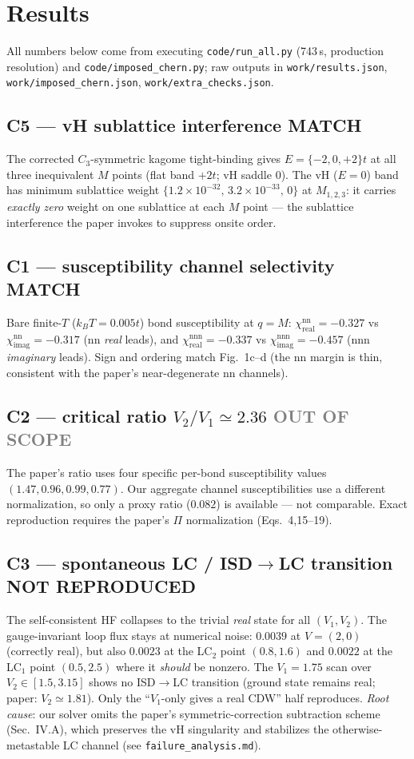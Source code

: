 \documentclass[11pt]{article}
\newcommand{\pass}{\textcolor{green!55!black}{\textbf{MATCH}}}
\newcommand{\fail}{\textcolor{red!75!black}{\textbf{NOT REPRODUCED}}}
\newcommand{\oos}{\textcolor{gray}{\textbf{OUT OF SCOPE}}}
\begin{document}
\section{Results}
All numbers below come from executing \texttt{code/run\_all.py} (743\,s,
production resolution) and \texttt{code/imposed\_chern.py}; raw outputs in
\texttt{work/results.json}, \texttt{work/imposed\_chern.json},
\texttt{work/extra\_checks.json}.

\subsection*{C5 --- vH sublattice interference \hfill \pass}
The corrected $C_3$-symmetric kagome tight-binding gives $E=\{-2,0,+2\}t$ at all
three inequivalent $M$ points (flat band $+2t$; vH saddle $0$). The vH ($E=0$)
band has minimum sublattice weight $\{1.2\times10^{-32},\,3.2\times10^{-33},\,0\}$
at $M_{1,2,3}$: it carries \emph{exactly zero} weight on one sublattice at each
$M$ point --- the sublattice interference the paper invokes to suppress onsite
order.

\subsection*{C1 --- susceptibility channel selectivity \hfill \pass}
Bare finite-$T$ ($k_BT=0.005t$) bond susceptibility at $q=M$:
$\chi^{\mathrm{nn}}_{\mathrm{real}}=-0.327$ vs
$\chi^{\mathrm{nn}}_{\mathrm{imag}}=-0.317$ (nn \emph{real} leads), and
$\chi^{\mathrm{nnn}}_{\mathrm{real}}=-0.337$ vs
$\chi^{\mathrm{nnn}}_{\mathrm{imag}}=-0.457$ (nnn \emph{imaginary} leads).
Sign and ordering match Fig.~1c--d (the nn margin is thin, consistent with the
paper's near-degenerate nn channels).

\subsection*{C2 --- critical ratio $V_2/V_1\simeq2.36$ \hfill \oos}
The paper's ratio uses four specific per-bond susceptibility values
$(1.47,0.96,0.99,0.77)$. Our aggregate channel susceptibilities use a different
normalization, so only a proxy ratio ($0.082$) is available --- not comparable.
Exact reproduction requires the paper's $\Pi$ normalization (Eqs.~4,15--19).

\subsection*{C3 --- spontaneous LC / ISD$\to$LC transition \hfill \fail}
The self-consistent HF collapses to the trivial \emph{real} state for all
$(V_1,V_2)$. The gauge-invariant loop flux stays at numerical noise:
$0.0039$ at $V=(2,0)$ (correctly real), but also $0.0023$ at the LC$_2$ point
$(0.8,1.6)$ and $0.0022$ at the LC$_1$ point $(0.5,2.5)$ where it \emph{should}
be nonzero. The $V_1=1.75$ scan over $V_2\in[1.5,3.15]$ shows no ISD$\to$LC
transition (ground state remains real; paper: $V_2\simeq1.81$).
Only the ``$V_1$-only gives a real CDW'' half reproduces.
\emph{Root cause}: our solver omits the paper's symmetric-correction subtraction
scheme (Sec.~IV.A), which preserves the vH singularity and stabilizes the
otherwise-metastable LC channel (see \texttt{failure\_analysis.md}).
\end{document}
